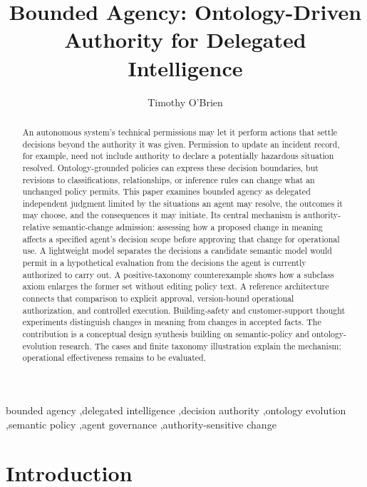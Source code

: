 \documentclass[
  english,
  12pt,
  a4paper,
  preprint,
  numbers,
  nopreprintline]{elsarticle}
\begin{document}
\begin{frontmatter}
\title{Bounded Agency: Ontology-Driven Authority for Delegated Intelligence}
\author{Timothy O'Brien}
\begin{abstract}
An autonomous system's technical permissions may let it perform actions
that settle decisions beyond the authority it was given. Permission to
update an incident record, for example, need not include authority to
declare a potentially hazardous situation resolved. Ontology-grounded
policies can express these decision boundaries, but revisions to
classifications, relationships, or inference rules can change what an
unchanged policy permits. This paper examines bounded agency as
delegated independent judgment limited by the situations an agent may
resolve, the outcomes it may choose, and the consequences it may
initiate. Its central mechanism is authority-relative semantic-change
admission: assessing how a proposed change in meaning affects a
specified agent's decision scope before approving that change for
operational use. A lightweight model separates the decisions a candidate
semantic model would permit in a hypothetical evaluation from the
decisions the agent is currently authorized to carry out. A
positive-taxonomy counterexample shows how a subclass axiom enlarges the
former set without editing policy text. A reference architecture
connects that comparison to explicit approval, version-bound operational
authorization, and controlled execution. Building-safety and
customer-support thought experiments distinguish changes in meaning from
changes in accepted facts. The contribution is a conceptual design
synthesis building on semantic-policy and ontology-evolution research.
The cases and finite taxonomy illustration explain the mechanism;
operational effectiveness remains to be evaluated.
\end{abstract}
\begin{keyword}
bounded agency \sep delegated intelligence \sep decision authority \sep ontology evolution \sep semantic policy \sep agent governance \sep authority-sensitive change
\end{keyword}
\end{frontmatter}

\section{Introduction}\label{introduction}
\end{document}
